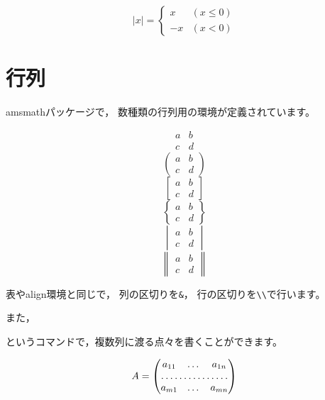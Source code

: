 \documentclass[class=jreport, crop=false, preview=false, dvipdfmx, fleqn]{standalone}
\begin{document}
\begin{IOTeX}
\[
| x | =
\begin{cases}
x & (x \leq 0) \\
-x & (x < 0)
\end{cases}
\]
\end{IOTeX}



\section{行列}
amsmathパッケージで，
数種類の行列用の環境が定義されています。

\begin{IOTeX}
\[
\begin{matrix}
a & b \\
c & d
\end{matrix}
\]
\[
\begin{pmatrix}
a & b \\
c & d
\end{pmatrix}
\]
\[
\begin{bmatrix}
a & b \\
c & d
\end{bmatrix}
\]
\[
\begin{Bmatrix}
a & b \\
c & d
\end{Bmatrix}
\]
\[
\begin{vmatrix}
a & b \\
c & d
\end{vmatrix}
\]
\[
\begin{Vmatrix}
a & b \\
c & d
\end{Vmatrix}
\]
\end{IOTeX}

表やalign環境と同じで，
列の区切りを\verb|&|，
行の区切りを\verb|\\|で行います。

また，
\begin{ITeX}
\end{ITeX}
というコマンドで，複数列に渡る点々を書くことができます。

\begin{IOTeX}
\[
A = 
\begin{pmatrix}
a_{11} & \dots & a_{1n}\\
\hdotsfor{3} \\
a_{m1} & \dots & a_{mn}
\end{pmatrix}
\]
\end{IOTeX}
\end{document}
